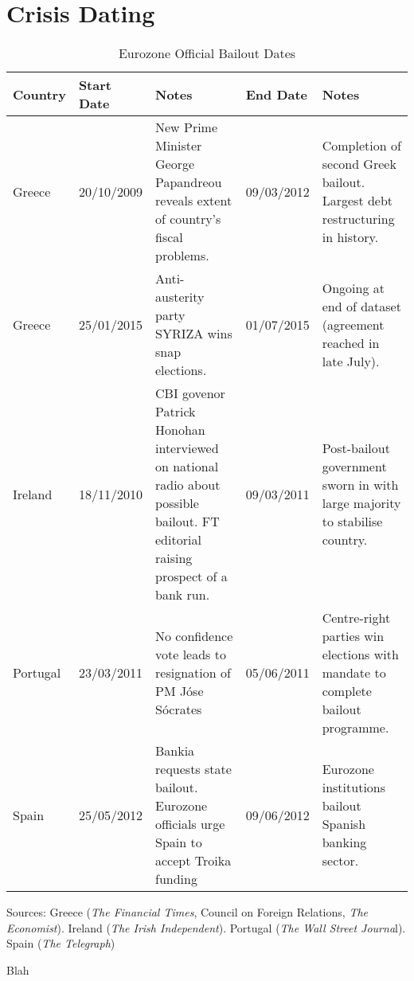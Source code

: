 \documentclass[/../base.tex]{subfiles}
\begin{document}
\section{Crisis Dating}
\label{a:crisis_dates}

\begin{table}[H]
	\centering
	\begin{threeparttable}
		\caption{Eurozone Official Bailout Dates}
		\centering
		\begin{tabular}{l l p{4cm} l p{4cm}}
			\toprule
			\toprule
			Country & Start Date & Notes & End Date & Notes \\
			\midrule
			Greece & 20/10/2009 & New Prime Minister George Papandreou reveals extent of country's fiscal problems. & 09/03/2012 & Completion of second Greek bailout. Largest debt restructuring in history. \\
			Greece & 25/01/2015 & Anti-austerity party SYRIZA wins snap elections. & 01/07/2015 & Ongoing at end of dataset (agreement reached in late July). \\
			Ireland & 18/11/2010 & CBI govenor Patrick Honohan interviewed on national radio about possible bailout. FT editorial raising prospect of a bank run. & 09/03/2011 & Post-bailout government sworn in with large majority to stabilise country. \\
			Portugal & 23/03/2011 & No confidence vote leads to resignation of PM J\'{o}se S\'{o}crates & 05/06/2011 & Centre-right parties win elections with mandate to complete bailout programme. \\	
			Spain & 25/05/2012 & Bankia requests state bailout. Eurozone officials urge Spain to accept Troika funding & 09/06/2012 & Eurozone institutions bailout Spanish banking sector. \\		
			\bottomrule
			\bottomrule
		\end{tabular}
		\begin{tablenotes}
			\small
			\item Sources: Greece (\textit{The Financial Times}, Council on Foreign Relations, \textit{The Economist}). Ireland (\textit{The Irish Independent}). Portugal (\textit{The Wall Street Journa}l). Spain (\textit{The Telegraph})
		\end{tablenotes}
		\label{tab:bailout_dates}
	\end{threeparttable}
\end{table}

\color{white} Blah
\end{document}

